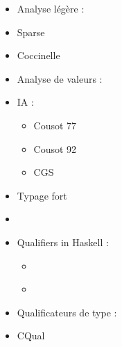 \begin{itemize}
\item
  Analyse légère :
\item
  Sparse \cite{TorvaldsSparse}
\item
  Coccinelle \cite{coccinelle09} \cite{coccinelle11} 
\item
  Analyse de valeurs :
\item
  IA :
  \begin{itemize}
  \item
    Cousot 77 \cite{Cousot77}
  \item
    Cousot 92 \cite{Cousot92-1}
  \item
    CGS \cite{cgs}
  \end{itemize}
\item
  Typage fort
\item
  \cite{TAPL}
\item
  Qualifiers in Haskell :
  \begin{itemize}
  \item
    \cite{lightweight-static-capabilities}
  \item
    \cite{LZ06a}
  \end{itemize}
\item
  Qualificateurs de type :
\item
  CQual \cite{pldi99,usenix01,pldi02,cquk-usenix04,toplas-quals}
\end{itemize}
